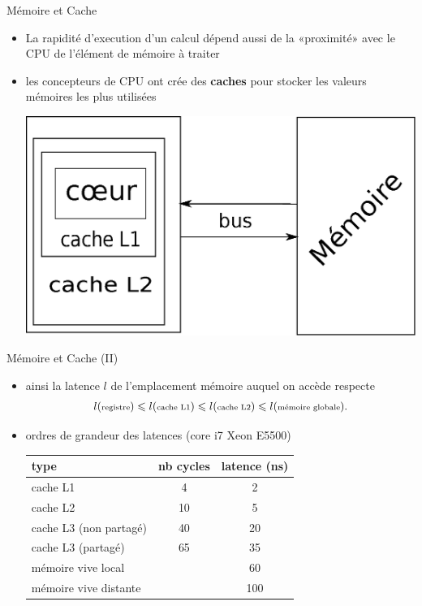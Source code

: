 \documentclass[11pt,mathserif]{beamer}
\newcommand{\gezi}{\faHandORight\ }
\begin{document}
\begin{frame}{Mémoire et Cache}
\begin{itemize}[<+->]
  \item La rapidité d'execution d'un calcul dépend aussi de la «proximité» avec le CPU de l'élément de mémoire à traiter 
  \item[\gezi] les concepteurs de CPU ont crée des {\bf caches} pour stocker les valeurs mémoires les plus utilisées
  \begin{center}
    \includegraphics[width=0.7\linewidth]{fig/cpu_classique.eps}
  \end{center}
\end{itemize}
\end{frame}
\begin{frame}{Mémoire et Cache (II)}
\pause
  \begin{itemize}[<+->]
  \item ainsi la latence $l$ de l'emplacement mémoire auquel on accède  respecte
  $$l({\mbox{\scriptsize registre}}) \leqslant l(\mbox{\scriptsize cache L1}) \leqslant
    l(\mbox{\scriptsize cache L2}) \leqslant l(\mbox{\scriptsize mémoire globale}).$$
  \item ordres de grandeur des latences (core i7 Xeon E5500)
    \begin{tabular}{|l|c|c|}
    \hline
      type & nb cycles & latence (ns)  \\
    \hline
      cache L1  &  4 & 2 \\
      cache L2  &  10 & 5 \\
      cache L3 (non partagé) & 40 & 20  \\
      cache L3 (partagé) &  65 & 35  \\
      mémoire vive local & & 60 \\
      mémoire vive distante & & 100 \\
    \hline
    \end{tabular}
  \end{itemize}
\end{frame}
\end{document}
